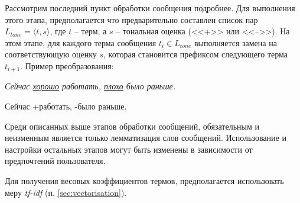     Рассмотрим последний пункт обработки сообщения подробнее.
    Для выполнения этого этапа, предполагается что предварительно составлен
    список пар $L_{tone} = {\langle t, s\rangle}$, где $t$ -- терм, а $s$ --
    тональная оценка (<<+>> или <<-->>). На этом этапе, для каждого терма сообщения $t_i \in L_{tone}$
    выполняется замена на соответствующую оценку $s$, которая становится префиксом
    следующего терма $t_{i+1}$. Пример преобразования:
    \begin{center}
        \it
        Сейчас \underline{хорошо} работать, \underline{плохо} было раньше.

        Сейчас +работать, -было раньше.
    \end{center}

    Среди описанных выше этапов обработки сообщений, обязательным и неизменным
    является только лемматизация слов сообщений. Использование и настройки
    остальных этапов могут быть изменены в зависимости от предпочтений
    пользователя.

    Для получения весовых коэффициентов термов, предполагается использовать меру {\it tf-idf} (п. \ref{sec:vectorisation}).

